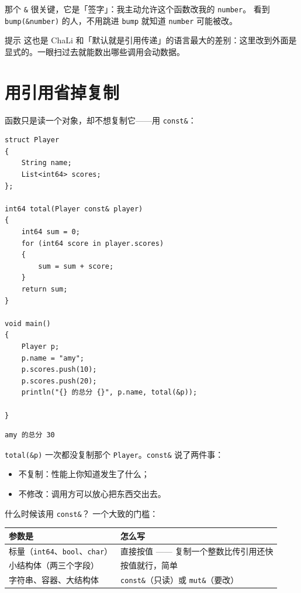 那个 \texttt{\&} 很关键，它是「签字」：我主动允许这个函数改我的 \texttt{number}。 看到 \texttt{bump(\allowbreak{}\&number)\allowbreak{}} 的人，不用跳进 \texttt{bump} 就知道 \texttt{number} 可能被改。

\begin{tip}{提示}
这也是 ChaLi 和「默认就是引用传递」的语言最大的差别：这里改到外面是显式的。一眼扫过去就能数出哪些调用会动数据。
\end{tip}

\section{用引用省掉复制}

函数只是读一个对象，却不想复制它——用 \texttt{const\&}：

\par
\medskip
\begin{lstlisting}[style=chali]
struct Player
{
    String name;
    List<int64> scores;
};

int64 total(Player const& player)
{
    int64 sum = 0;
    for (int64 score in player.scores)
    {
        sum = sum + score;
    }
    return sum;
}

void main()
{
    Player p;
    p.name = "amy";
    p.scores.push(10);
    p.scores.push(20);
    println("{} 的总分 {}", p.name, total(&p));

}
\end{lstlisting}
\par
\medskip

\par
\medskip
\begin{lstlisting}[style=out]
amy 的总分 30
\end{lstlisting}
\par
\medskip

\texttt{total(\allowbreak{}\&p)\allowbreak{}} 一次都没复制那个 \texttt{Player}。\texttt{const\&} 说了两件事：

\begin{itemize}

\item 不复制：性能上你知道发生了什么；

\item 不修改：调用方可以放心把东西交出去。

\end{itemize}

什么时候该用 \texttt{const\&}？ 一个大致的门槛：

\begin{center}
\begin{tabular}{ll}
\toprule
参数是 & 怎么写 \\
\midrule
标量（\texttt{int64}、\texttt{bool}、\texttt{char}） & 直接按值 —— 复制一个整数比传引用还快 \\
小结构体（两三个字段） & 按值就行，简单 \\
字符串、容器、大结构体 & \texttt{const\&}（只读）或 \texttt{mut\&}（要改） \\
\bottomrule
\end{tabular}
\end{center}

